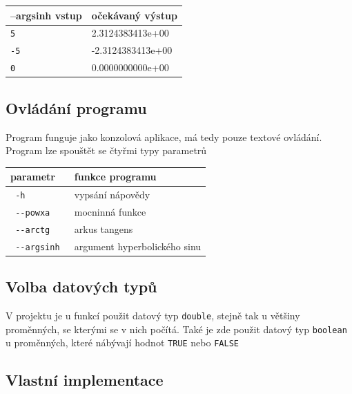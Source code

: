 \documentclass[12pt,a4paper,titlepage,final]{article}
\begin{document}
\vspace{1em}\begin{tabular}{ll} %
--argsinh
vstup & očekávaný výstup \\
\hline         
\verb|5| & 2.3124383413e+00 \\
\verb|-5| & -2.3124383413e+00 \\
\verb|0| & 0.0000000000e+00 \\

\end{tabular}

\subsection{Ovládání programu}

Program funguje jako konzolová aplikace, má tedy pouze textové ovládání.
Program lze spouštět se čtyřmi typy parametrů

\vspace{1em}\begin{tabular}{ll} %
parametr & funkce programu \\
\hline
\verb| -h | & vypsání nápovědy \\
\verb| --powxa | & mocninná funkce \\
\verb| --arctg | & arkus tangens \\
\verb| --argsinh | & argument hyperbolického sinu \\
\end{tabular}

\subsection{Volba datových typů}

V projektu je u funkcí použit datový typ \texttt{double}, stejně tak u většiny
proměnných, se kterými se v nich počítá. Také je zde použit datový typ
\texttt{boolean} u proměnných, které nábývají hodnot \texttt{TRUE}
nebo \texttt{FALSE}

\subsection{Vlastní implementace}
\end{document}
